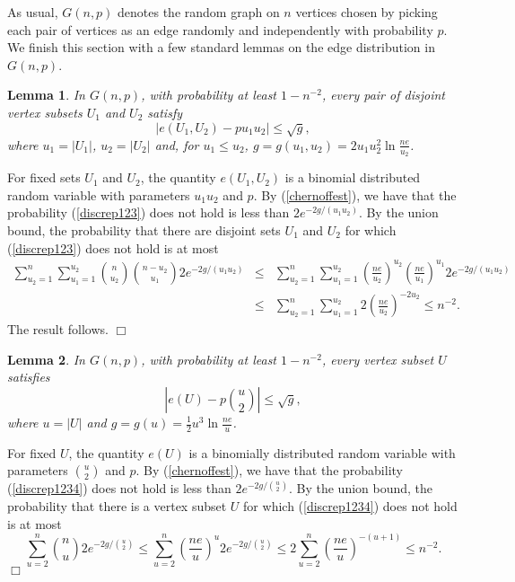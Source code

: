 \documentclass[11pt]{article}
\newtheorem{lemma}{Lemma}[section]
\newenvironment{proof}
      {\medskip\noindent{\bf Proof:}\hspace{1mm}}
      {\hfill$\Box$\medskip}
\begin{document}
As usual, $G(n,p)$ denotes the random graph on $n$ vertices chosen by picking
each pair of vertices as an edge randomly and independently with probability
$p$. We finish this section with a few standard lemmas on the edge distribution
in $G(n,p)$.

\begin{lemma}\label{fdis}
In $G(n,p)$, with probability at least $1 - n^{-2}$, every pair of disjoint
vertex subsets $U_1$ and $U_2$ satisfy \begin{equation}\label{discrep123}
|e(U_1,U_2)-pu_1u_2| \leq
\sqrt{g},\end{equation}
where $u_1 = |U_1|$, $u_2 = |U_2|$ and, for $u_1 \leq u_2$,
$g=g(u_1,u_2)=2u_1u_2^2\ln \frac{ne}{u_2}$.
\end{lemma}
\begin{proof}
For fixed sets $U_1$ and $U_2$, the quantity $e(U_1,U_2)$ is a binomial
distributed random variable with parameters $u_1u_2$ and $p$. By
(\ref{chernoffest}), we have that the probability (\ref{discrep123}) does not
hold is
less than $2e^{-2g/(u_1u_2)}$.
By the union bound, the probability that there are disjoint sets $U_1$ and
$U_2$ for which (\ref{discrep123}) does not hold is at most \begin{eqnarray*}
\sum_{u_2=1}^{n}\sum_{u_1=1}^{u_2} {n \choose u_2}{n-u_2 \choose
u_1}2e^{-2g/(u_1u_2)}
& \leq & \sum_{u_2=1}^{n}\sum_{u_1=1}^{u_2}
\left(\frac{ne}{u_2}\right)^{u_2}\left(\frac{ne}{u_1}\right)^{u_1}2e^{-2g/(u_1u_2)}
\\ & \leq & \sum_{u_2=1}^{n}\sum_{u_1=1}^{u_2}
2\left(\frac{ne}{u_2}\right)^{-2u_2}
\leq n^{-2}.\end{eqnarray*}
The result follows.
\end{proof}

\begin{lemma}\label{sdis}
In $G(n,p)$, with probability at least $1 -n^{-2}$, every vertex subset $U$
satisfies \begin{equation}\label{discrep1234}|e(U)-p{u \choose 2}|
\leq \sqrt{g},\end{equation}
where $u = |U|$ and $g=g(u)=\frac{1}{2}u^{3}\ln \frac{ne}{u}$.
\end{lemma}
\begin{proof}
For fixed $U$, the quantity $e(U)$ is a binomially distributed random variable
with parameters ${u \choose 2}$ and $p$. By (\ref{chernoffest}), we have that
the
probability (\ref{discrep1234}) does not hold is less than $2e^{-2g/{u \choose
2}}$.
By the union bound, the probability that there is a vertex subset $U$ for which
(\ref{discrep1234}) does not hold is at most $$\sum_{u=2}^{n}{n \choose
u}2e^{-2g/{u
\choose 2}}
\leq \sum_{u=2}^{n}\left(\frac{ne}{u}\right)^{u}2e^{-2g/{u \choose 2}}
\leq 2\sum_{u=2}^{n}\left(\frac{ne}{u}\right)^{-(u+1)} \leq n^{-2}.$$
\end{proof}
\end{document}
